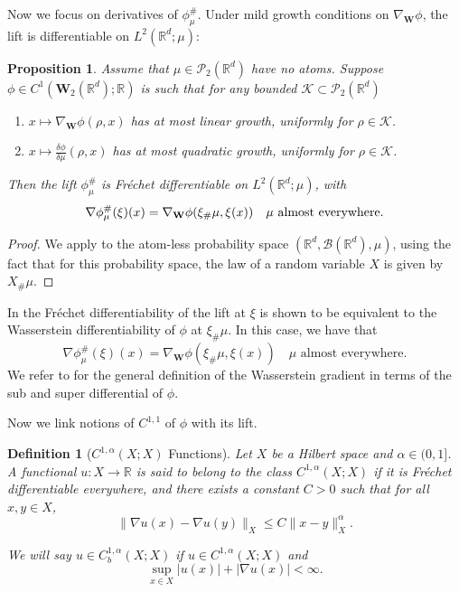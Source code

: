 \documentclass[11pt,a4paper]{amsart}
\newcommand{\1}{\mathds{1}}
\newcommand{\R}{{\mathbb R}}
\newtheorem{proposition}[theorem]{\textbf{Proposition}}
\newtheorem{definition}[theorem]{\textbf{Definition}}
\numberwithin{equation}{section}
\begin{document}
Now we focus on derivatives of $\phi^{\#}_{\mu}$. Under mild growth conditions on $\nabla_{\mathbf{W}} \phi$, the lift is differentiable on $L^2(\R^d;\mu)$:


\begin{proposition} \cite[Proposition 5.48]{carmona2018probabilistic}  \label{differentiability_equivalence} 
Assume that $\mu \in \mathcal{P}_2(\mathbb{R}^d)$ have no atoms. Suppose $\phi \in C^1(\mathbf{W}_2(\mathbb{R}^d);\mathbb{R})$ is such that for any bounded $\mathcal{K} \subset \mathcal{P}_2(\R^d)$
\begin{enumerate}
    \item $x \mapsto \nabla_{\mathbf{W}} \phi(\rho, x)$ has at most linear growth, uniformly for $\rho \in \mathcal{K}$.
    \item $x \mapsto \frac{\delta \phi}{\delta \mu}(\rho, x)$ has at most quadratic growth, uniformly for $\rho \in \mathcal{K}$.
\end{enumerate}
Then the lift $\phi^{\#}_{\mu}$ is Fréchet differentiable on $L^2(\mathbb{R}^d; \mu)$, with
\[
\nabla \phi^{\#}_{\mu}(\xi)(x) = \nabla_{\mathbf{W}} \phi(\xi_{\#} \mu, \xi(x)) \quad \mu \textnormal{ almost everywhere}.
\]
\end{proposition}

\begin{proof}
We apply \cite[Proposition 5.48]{carmona2018probabilistic} to the atom-less probability space $(\mathbb{R}^d, \mathcal{B}(\mathbb{R}^d), \mu)$, using the fact that for this probability space, the law of a random variable $X$ is given by $X_{\#} \mu$. \end{proof}

In \cite[Corollary 3.22]{gangbo2019differentiability} the Fréchet differentiability of the lift at $\xi$ is shown to be equivalent to the Wasserstein differentiability of $\phi$ at $\xi_{\#} \mu$. In this case, we have that
\[ \nabla \phi^{\#}_{\mu}(\xi)(x) = \nabla_{\mathbf{W}} \phi(\xi_{\#} \mu,\xi(x)) \quad \mu \text{ almost everywhere.} \] We refer to \cite{gangbo2019differentiability} for the general definition of the Wasserstein gradient in terms of the sub and super differential of $\phi$. \smallskip


Now we link notions of $C^{1,1}$ of $\phi$ with its lift.

 \begin{definition}[$C^{1,\alpha}(X;X)$ Functions]  
 Let $X$ be a Hilbert space and $\alpha \in (0,1]$. A functional $u: X \to \mathbb{R}$ is said to belong to the class $C^{1,\alpha}(X;X)$ if it is Fréchet differentiable everywhere, and there exists a constant $C > 0$ such that for all $x, y \in X$,
 \[
 \big\| \nabla u(x) - \nabla u(y) \big\|_X 
 \leq C \big\| x - y \big\|_X^{\alpha}.
 \]

\noindent We will say $u \in C^{1,\alpha}_b(X;X)$ if $u \in C^{1,\alpha}(X;X)$ and
\[ \sup_{x \in X} |u(x)|+|\nabla u(x)|  < \infty. \]

 \end{definition}
\end{document}
